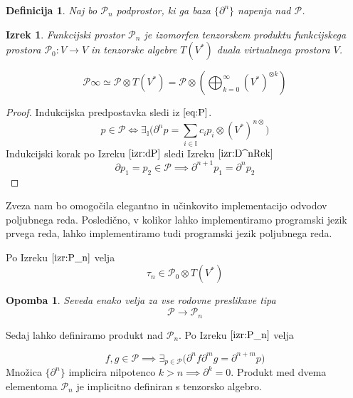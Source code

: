 \documentclass{article}
\newcommand{\II}{\mathbb{I}}
\newcommand{\dP}{\mathcal{P}}
\newcommand{\D}{\partial}
\newcommand{\sumd}{\tau}
\newtheorem{definicija}{Definicija}[section]
\newtheorem{izrek}{Izrek}[section]
\newtheorem{opomba}{Opomba}[section]
\begin{document}
\begin{definicija}
Naj bo $\dP_n$ podprostor, ki ga baza $\{\partial^n\}$ napenja nad $\dP$.
 \end{definicija}
 
 \begin{izrek}\label{izr:P_n}
 	Funkcijski prostor $\dP_n$ je izomorfen tenzorskem produktu funkcijskega prostora $\dP_0:V\to V$ in tenzorske algebre $T(V^*)$ duala virtualnega prostora $V$.
 	
 	\begin{equation}
 	\label{eq:P_algebra}
 	 	    \dP\infty\simeq \dP\otimes T(V^*) = \dP \otimes\left(\bigoplus_{k=0}^\infty (V^*)^{\otimes k} \right)
 	\end{equation}
 \end{izrek}
 
 \begin{proof} 
 Indukcijska predpostavka sledi iz $\eqref{eq:P}$.
 \begin{equation}
 	p\in\dP\iff \exists_{\II}\Big(\D^np=\sum\limits_{i\in\II} c_ip_i\otimes(V^*)^{n\otimes}\Big)
 \end{equation}
 Indukcijski korak po Izreku $\ref{izr:dP}$ sledi Izreku $\ref{izr:D^nRek}$ 
 $$\D p_1=p_2\in \dP\implies \D^{n+1}p_1=\D^np_2$$
  \end{proof}

   Zveza nam bo omogočila elegantno in učinkovito implementacijo odvodov poljubnega reda. Posledično, v kolikor lahko implementiramo programski jezik prvega reda, lahko implementiramo tudi programski jezik poljubnega reda.
     
     Po Izreku $\ref{izr:P_n}$ velja
     \begin{equation}
     	\sumd_n\in\dP_0\otimes T(V^*)
     \end{equation}
   
        \begin{opomba}
        Seveda enako velja za vse rodovne preslikave tipa
        $$\dP\to\dP_n$$
        \end{opomba}
        
Sedaj lahko definiramo produkt nad $\dP_n$. Po Izreku $\ref{izr:P_n}$ velja

\begin{equation}
	f,g\in\dP\implies\exists_{p\in\dP}\Big(\D^nf\D^mg=\D^{n+m}p\Big)
\end{equation}
Množica $\{\D^n\}$ implicira nilpotenco $k>n\implies\D^k=0$. Produkt med dvema elementoma $\dP_n$ je implicitno definiran s tenzorsko algebro. 
\end{document}
